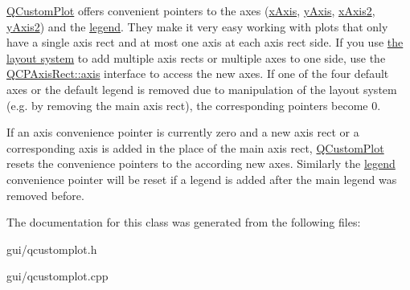 \hyperlink{classQCustomPlot}{Q\+Custom\+Plot} offers convenient pointers to the axes (\hyperlink{classQCustomPlot_a9a79cd0158a4c7f30cbc702f0fd800e4}{x\+Axis}, \hyperlink{classQCustomPlot_af6fea5679725b152c14facd920b19367}{y\+Axis}, \hyperlink{classQCustomPlot_ada41599f22cad901c030f3dcbdd82fd9}{x\+Axis2}, \hyperlink{classQCustomPlot_af13fdc5bce7d0fabd640f13ba805c0b7}{y\+Axis2}) and the \hyperlink{classQCustomPlot_a4eadcd237dc6a09938b68b16877fa6af}{legend}. They make it very easy working with plots that only have a single axis rect and at most one axis at each axis rect side. If you use \hyperlink{}{the layout system} to add multiple axis rects or multiple axes to one side, use the \hyperlink{classQCPAxisRect_a583ae4f6d78b601b732183f6cabecbe1}{Q\+C\+P\+Axis\+Rect\+::axis} interface to access the new axes. If one of the four default axes or the default legend is removed due to manipulation of the layout system (e.\+g. by removing the main axis rect), the corresponding pointers become 0.

If an axis convenience pointer is currently zero and a new axis rect or a corresponding axis is added in the place of the main axis rect, \hyperlink{classQCustomPlot}{Q\+Custom\+Plot} resets the convenience pointers to the according new axes. Similarly the \hyperlink{classQCustomPlot_a4eadcd237dc6a09938b68b16877fa6af}{legend} convenience pointer will be reset if a legend is added after the main legend was removed before. 

The documentation for this class was generated from the following files\+:\begin{DoxyCompactItemize}
\item 
gui/qcustomplot.\+h\item 
gui/qcustomplot.\+cpp\end{DoxyCompactItemize}
